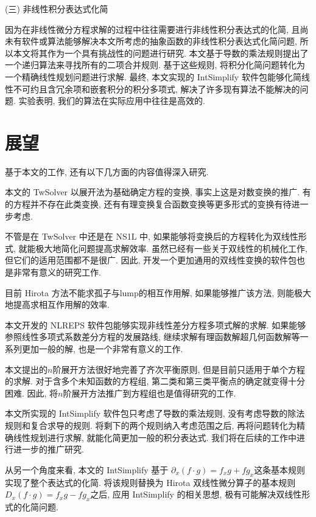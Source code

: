 (三) 非线性积分表达式化简

因为在非线性微分方程求解的过程中往往需要进行非线性积分表达式的化简, 且尚未有软件或算法能够解决本文所考虑的抽象函数的非线性积分表达式化简问题, 所以本文将其作为一个具有挑战性的问题进行研究. 本文基于导数的乘法规则提出了一个递归算法来寻找所有的二项合并规则. 基于这些规则, 将积分化简问题转化为一个精确线性规划问题进行求解. 最终, 本文实现的 IntSimplify 软件包能够化简线性不可约且含冗余项和嵌套积分的积分多项式, 解决了许多现有算法不能解决的问题. 实验表明, 我们的算法在实际应用中往往是高效的. 

\section{展望}
基于本文的工作, 还有以下几方面的内容值得深入研究.
\begin{compactenum}[(1)]
\item 本文的 TwSolver 以\Painleve{}展开法为基础确定方程的变换, 事实上这是对数变换的推广. 有的方程并不存在此类变换, 还有有理变换\D 复合函数变换等更多形式的变换有待进一步考虑.
\item 不管是在 TwSolver 中还是在 NS1L 中, 如果能够将变换后的方程转化为双线性形式, 就能极大地简化问题\D 提高求解效率. 虽然已经有一些关于双线性的机械化工作, 但它们的适用范围都不是很广. 因此, 开发一个更加通用的双线性变换的软件包也是非常有意义的研究工作. 
\item 目前 Hirota 方法不能求孤子与lump的相互作用解, 如果能够推广该方法, 则能极大地提高求相互作用解的效率. 
\item 本文开发的 NLREPS 软件包能够实现非线性差分方程多项式解的求解. 如果能够参照线性多项式系数差分方程的发展路线, 继续求解有理函数解\D 超几何函数解等一系列更加一般的解, 也是一个非常有意义的工作. 
\item 本文提出的$n$阶展开方法很好地完善了齐次平衡原则, 但是目前只适用于单个方程的求解. 对于含多个未知函数的方程组, 第二类和第三类平衡点的确定就变得十分困难. 因此, 将$n$阶展开方法推广到方程组也是值得研究的工作.
\item 本文所实现的 IntSimplify 软件包只考虑了导数的乘法规则, 没有考虑导数的除法规则和复合求导的规则. 将剩下的两个规则纳入考虑范围之后, 再将问题转化为精确线性规划进行求解, 就能化简更加一般的积分表达式. 我们将在后续的工作中进行进一步的推广研究. 
\item 从另一个角度来看, 本文的 IntSimplify 基于 $\partial_x (f\cdot g)=f_xg+fg_x$这条基本规则实现了整个表达式的化简. 将该规则替换为 Hirota 双线性微分算子的基本规则$D_x(f\cdot g)=f_xg-fg_x$之后, 应用 IntSimplify 的相关思想, 极有可能解决双线性形式的化简问题.
\end{compactenum}
